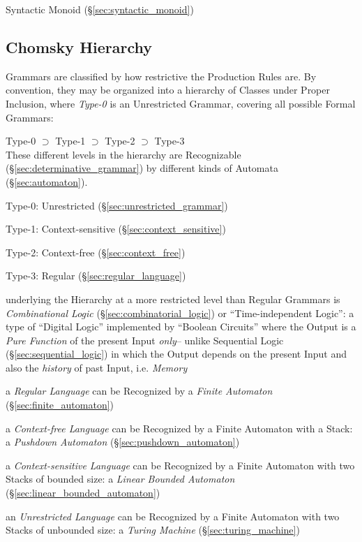 Syntactic Monoid (\S\ref{sec:syntactic_monoid})



\subsection{Chomsky Hierarchy}\label{sec:chomsky_hierarchy}
\cite{chomsky56}

Grammars are classified by how restrictive the Production Rules are. By
convention, they may be organized into a hierarchy of Classes under Proper
Inclusion, where \emph{Type-0} is an Unrestricted Grammar, covering all possible
Formal Grammars:

  Type-0 $\supset$ Type-1 $\supset$ Type-2 $\supset$ Type-3 \\
These different levels in the hierarchy are Recognizable
(\S\ref{sec:determinative_grammar}) by different kinds of Automata
(\S\ref{sec:automaton}).

Type-0: Unrestricted (\S\ref{sec:unrestricted_grammar})

Type-1: Context-sensitive (\S\ref{sec:context_sensitive})

Type-2: Context-free (\S\ref{sec:context_free})

Type-3: Regular (\S\ref{sec:regular_language})

underlying the Hierarchy at a more restricted level than Regular Grammars is
\emph{Combinational Logic} (\S\ref{sec:combinatorial_logic}) or
``Time-independent Logic'': a type of ``Digital Logic'' implemented by ``Boolean
Circuits'' where the Output is a \emph{Pure Function} of the present Input
\emph{only}-- unlike Sequential Logic (\S\ref{sec:sequential_logic}) in which
the Output depends on the present Input and also the \emph{history} of past
Input, i.e. \emph{Memory}

a \emph{Regular Language} can be Recognized by a \emph{Finite Automaton}
(\S\ref{sec:finite_automaton})

a \emph{Context-free Language} can be Recognized by a Finite Automaton with a
Stack: a \emph{Pushdown Automaton} (\S\ref{sec:pushdown_automaton})

a \emph{Context-sensitive Language} can be Recognized by a Finite Automaton with
two Stacks of bounded size: a \emph{Linear Bounded Automaton}
(\S\ref{sec:linear_bounded_automaton})

an \emph{Unrestricted Language} can be Recognized by a Finite Automaton with two
Stacks of unbounded size: a \emph{Turing Machine} (\S\ref{sec:turing_machine})



